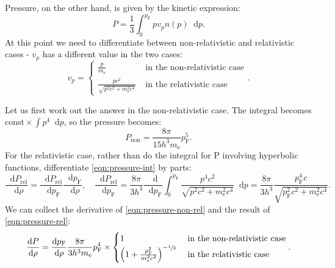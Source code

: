 \documentclass[]{article}
\newcommand{\dd}{\mathop{}\!\mathrm{d}}
\newcommand{\fermiMtm}{p_\mathrm{F}}
\newcommand{\massElectron}{m_\mathrm{e}}
\begin{document}
	Pressure, on the other hand, is given by the kinetic expression:
	\begin{equation}\label{eqn:pressure-int}
		P = \frac{1}{3} \int_0^{\fermiMtm} p v_p n(p) \dd p.
	\end{equation}
	At this point we need to differentiate between non-relativistic and relativistic cases - $v_p$ has a different value in the two cases:
	\begin{equation}
		v_p = \begin{cases}
			\frac{p}{\massElectron} & \text{ in the non-relativistic case} \\
			\frac{pc^2}{\sqrt{p^2c^2 + \massElectron^2 c^4}} & \text{ in the relativistic case}
		\end{cases}.
	\end{equation}

	Let us first work out the answer in the non-relativistic case. The integral becomes $\text{const} \times \int p^4 \dd p$, so the pressure becomes:
	\begin{equation}\label{eqn:pressure-non-rel}
		P_\mathrm{non} = \frac{8 \pi}{15 h^3 \massElectron} \fermiMtm^5.
	\end{equation}
	For the relativistic case, rather than do the integral for P involving hyperbolic functions, differentiate \eqref{eqn:pressure-int} by parts:
	\begin{equation}\label{eqn:pressure-rel}
		\frac{\dd P_\mathrm{rel}}{\dd \rho} = \frac{\dd P_\mathrm{rel}}{\dd \fermiMtm} \frac{\dd \fermiMtm}{\dd \rho}, \quad \frac{\dd P_\mathrm{rel}}{\dd \fermiMtm} = \frac{8\pi}{3h^3}\frac{\dd}{\dd \fermiMtm}\int_0^{\fermiMtm} \frac{p^4 c^2}{\sqrt{p^2c^2 + \massElectron^2 c^4}} \dd p = \frac{8\pi}{3h^3} \frac{\fermiMtm^4 c}{\sqrt{\fermiMtm^2c^2 + \massElectron^2 c^4}}.
	\end{equation}
	We can collect the derivative of \eqref{eqn:pressure-non-rel} and the result of \eqref{eqn:pressure-rel}:
	\begin{equation}\label{eqn:pressure-both}
		\frac{\dd P}{\dd \rho} = \frac{\dd \fermiMtm}{\dd \rho}\frac{8 \pi}{3 h^3 \massElectron} \fermiMtm^4 \times \begin{cases}
			1 & \text{ in the non-relativistic case} \\
			\left(1 + \frac{\fermiMtm^2}{\massElectron^2 c^2}\right)^{-\sfrac{1}{2}} & \text{ in the relativistic case}
		\end{cases}.
 	\end{equation}
\end{document}
